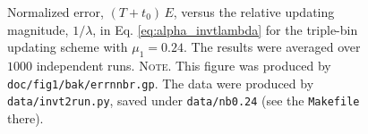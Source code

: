 \documentclass[reprint, floatfix]{revtex4-1}
\newcommand{\note}[1]{{\color{DarkGreen}\footnotesize \textsc{Note.} #1}}
\begin{document}


\begin{figure}[h]
\begin{center}
  \caption{
    \label{fig:errnnbr}
    Normalized error, $(T + t_0) \, E$,
    versus the %
    relative updating magnitude,
    $1/\lambda$,
    in Eq. \eqref{eq:alpha_invtlambda}
    for the triple-bin updating scheme with $\mu_1 = 0.24$.
    The results were averaged over $1000$ independent runs.
    \note{This figure was produced by \texttt{doc/fig1/bak/errnnbr.gp}.
      The data were produced by \texttt{data/invt2run.py},
      saved under \texttt{data/nb0.24}
      (see the \texttt{Makefile} there).
    }%
  }
\end{center}
\end{figure}
\end{document}

